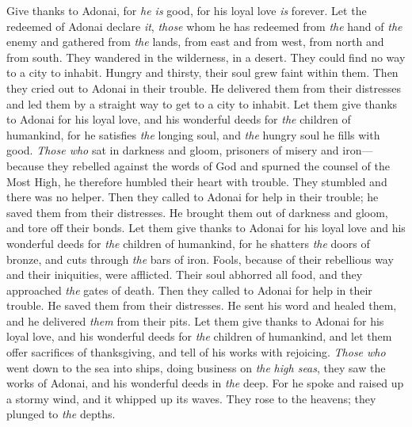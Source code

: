 \begin{biblechapter} %
 Give thanks to Adonai, for \textit{he is} good, 
for his loyal love \textit{is} forever.
\verse Let the redeemed of Adonai declare \textit{it}, 
\textit{those} whom he has redeemed from \textit{the} hand of \textit{the} enemy
\verse and gathered from \textit{the} lands, 
from east and from west, from north and from south.
\verse They wandered in the wilderness, in a desert. 
They could find no way to a city to inhabit.
\verse Hungry and thirsty, 
their soul grew faint within them.
\verse Then they cried out to Adonai in their trouble. 
He delivered them from their distresses
\verse and led them by a straight way 
to get to a city to inhabit.
\verse Let them give thanks to Adonai for his loyal love, 
and his wonderful deeds for \textit{the} children of humankind,
\verse for he satisfies \textit{the} longing soul, 
and \textit{the} hungry soul he fills with good.
\verse \textit{Those who} sat in darkness and gloom, 
prisoners of misery and iron—
\verse because they rebelled against the words of God 
and spurned the counsel of the Most High,
\verse he therefore humbled their heart with trouble. 
They stumbled and there was no helper.
\verse Then they called to Adonai for help in their trouble; 
he saved them from their distresses.
\verse He brought them out of darkness and gloom, 
and tore off their bonds.
\verse Let them give thanks to Adonai for his loyal love 
and his wonderful deeds for \textit{the} children of humankind,
\verse for he shatters \textit{the} doors of bronze, 
and cuts through \textit{the} bars of iron.
\verse Fools, because of their rebellious way 
and their iniquities, were afflicted.
\verse Their soul abhorred all food, 
and they approached \textit{the} gates of death.
\verse Then they called to Adonai for help in their trouble. 
He saved them from their distresses.
\verse He sent his word and healed them, 
and he delivered \textit{them} from their pits.
\verse Let them give thanks to Adonai for his loyal love, 
and his wonderful deeds for \textit{the} children of humankind,
\verse and let them offer sacrifices of thanksgiving, 
and tell of his works with rejoicing.
\verse \textit{Those who} went down to the sea into ships, 
doing business on \textit{the} \textit{high seas},
\verse they saw the works of Adonai, 
and his wonderful deeds in \textit{the} deep.
\verse For he spoke and raised up a stormy wind, 
and it whipped up its waves.
\verse They rose to the heavens; they plunged to \textit{the} depths. 

\end{biblechapter}
